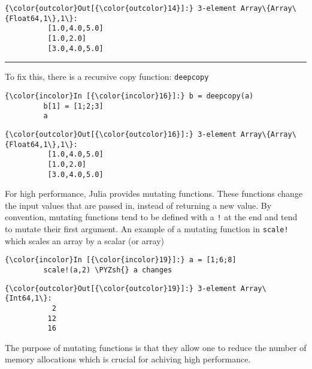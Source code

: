 \documentclass[11pt]{article}
\def\PYZsh{\char`\#}
\begin{document}
            \begin{Verbatim}[commandchars=\\\{\}]
{\color{outcolor}Out[{\color{outcolor}14}]:} 3-element Array\{Array\{Float64,1\},1\}:
          [1.0,4.0,5.0]
          [1.0,2.0]    
          [3.0,4.0,5.0]
\end{Verbatim}
        
    \begin{center}\rule{3in}{0.4pt}\end{center}

To fix this, there is a recursive copy function: \texttt{deepcopy}

    \begin{Verbatim}[commandchars=\\\{\}]
{\color{incolor}In [{\color{incolor}16}]:} b = deepcopy(a)
         b[1] = [1;2;3]
         a
\end{Verbatim}

            \begin{Verbatim}[commandchars=\\\{\}]
{\color{outcolor}Out[{\color{outcolor}16}]:} 3-element Array\{Array\{Float64,1\},1\}:
          [1.0,4.0,5.0]
          [1.0,2.0]    
          [3.0,4.0,5.0]
\end{Verbatim}
        
    For high performance, Julia provides mutating functions. These functions
change the input values that are passed in, instead of returning a new
value. By convention, mutating functions tend to be defined with a
\texttt{!} at the end and tend to mutate their first argument. An
example of a mutating function in \texttt{scale!} which scales an array
by a scalar (or array)

    \begin{Verbatim}[commandchars=\\\{\}]
{\color{incolor}In [{\color{incolor}19}]:} a = [1;6;8]
         scale!(a,2) \PYZsh{} a changes
\end{Verbatim}

            \begin{Verbatim}[commandchars=\\\{\}]
{\color{outcolor}Out[{\color{outcolor}19}]:} 3-element Array\{Int64,1\}:
           2
          12
          16
\end{Verbatim}
        
    The purpose of mutating functions is that they allow one to reduce the
number of memory allocations which is crucial for achiving high
performance.
\end{document}
